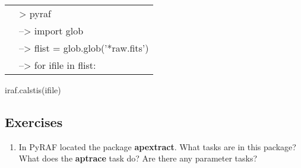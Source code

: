\begin{minipage}{4in}
\setlength{\oddsidemargin}{0.25 in}
\setlength{\evensidemargin}{0.25 in}
\begin{tabular}{ll}
& {\color{RoyalBlue}> pyraf}\\
& {\color{RoyalBlue}--> import glob}\\
& {\color{RoyalBlue}--> flist = glob.glob('*raw.fits')}\\
& {\color{RoyalBlue}--> for ifile in flist:}\\
\end{tabular}
\setlength{\parindent}{0.5 in}

{\color{RoyalBlue}iraf.calstis(ifile)}\\
\end{minipage}

\subsection{Exercises}
\begin{enumerate}
\item In PyRAF located the package {\bf apextract}. What tasks are in this package? What does the {\bf aptrace} task do? Are there any parameter tasks?
\end{enumerate}

